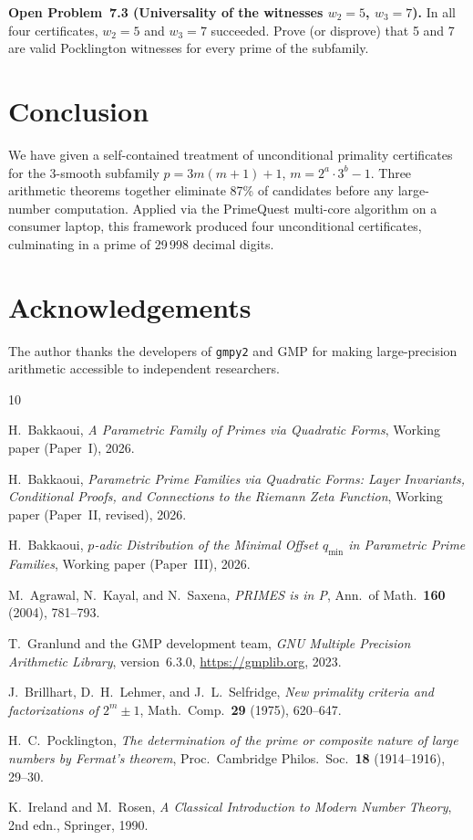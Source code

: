 \documentclass[11pt,a4paper]{article}
\theoremstyle{plain}
\theoremstyle{definition}
\begin{document}
\begin{openproblem}\label{op:witnesses}
\textbf{Open Problem~7.3 (Universality of the witnesses $w_2 = 5$, $w_3 = 7$).}
In all four certificates, $w_2 = 5$ and $w_3 = 7$ succeeded. Prove (or
disprove) that 5 and 7 are valid Pocklington witnesses for every prime of
the subfamily.
\end{openproblem}

\section{Conclusion}
\label{sec:conclusion}

We have given a self-contained treatment of unconditional primality
certificates for the 3-smooth subfamily $p = 3m(m+1) + 1$,
$m = 2^a \cdot 3^b - 1$. Three arithmetic theorems together eliminate 87\%
of candidates before any large-number computation. Applied via the PrimeQuest
multi-core algorithm on a consumer laptop, this framework produced four
unconditional certificates, culminating in a prime of 29\,998 decimal digits.

\section*{Acknowledgements}

The author thanks the developers of \texttt{gmpy2} and GMP for making
large-precision arithmetic accessible to independent researchers.

\begin{thebibliography}{10}

 H.~Bakkaoui, \textit{A Parametric Family of Primes via
Quadratic Forms}, Working paper (Paper~I), 2026.

 H.~Bakkaoui, \textit{Parametric Prime Families via Quadratic
Forms: Layer Invariants, Conditional Proofs, and Connections to the Riemann
Zeta Function}, Working paper (Paper~II, revised), 2026.

 H.~Bakkaoui, \textit{$p$-adic Distribution of the Minimal
Offset $q_{\min}$ in Parametric Prime Families}, Working paper (Paper~III), 2026.

 M.~Agrawal, N.~Kayal, and N.~Saxena, \textit{PRIMES is in P},
Ann.\ of Math.\ \textbf{160} (2004), 781--793.

 T.~Granlund and the GMP development team, \textit{GNU Multiple
Precision Arithmetic Library}, version~6.3.0, \url{https://gmplib.org}, 2023.

 J.~Brillhart, D.~H.~Lehmer, and J.~L.~Selfridge,
\textit{New primality criteria and factorizations of $2^m \pm 1$}, Math.\
Comp.\ \textbf{29} (1975), 620--647.

 H.~C.~Pocklington, \textit{The determination of the prime or
composite nature of large numbers by Fermat's theorem}, Proc.\ Cambridge
Philos.\ Soc.\ \textbf{18} (1914--1916), 29--30.

 K.~Ireland and M.~Rosen, \textit{A Classical
Introduction to Modern Number Theory}, 2nd edn., Springer, 1990.

\end{thebibliography}
\end{document}

